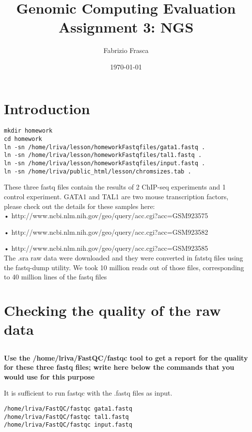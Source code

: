 \documentclass[12pt, a4paper]{article}
\title{\textbf{Genomic Computing Evaluation}\\Assignment 3: NGS}
\author{Fabrizio Frasca}
\date{\today}
\begin{document}
	
\maketitle
\clearpage

\section*{Introduction}

\begin{verbatim}
mkdir homework
cd homework
ln -sn /home/lriva/lesson/homeworkFastqfiles/gata1.fastq .
ln -sn /home/lriva/lesson/homeworkFastqfiles/tal1.fastq .
ln -sn /home/lriva/lesson/homeworkFastqfiles/input.fastq .
ln -sn /home/lriva/public_html/lesson/chromsizes.tab .
\end{verbatim}

These three fastq files contain the results of 2 ChIP-seq experiments and 1 control experiment.
GATA1 and TAL1 are two mouse transcription factors, please check out the details for these samples here:\\

• http://www.ncbi.nlm.nih.gov/geo/query/acc.cgi?acc=GSM923575

• http://www.ncbi.nlm.nih.gov/geo/query/acc.cgi?acc=GSM923582

• http://www.ncbi.nlm.nih.gov/geo/query/acc.cgi?acc=GSM923585\\


The .sra raw data were downloaded and they were converted in fatstq files using the fastq-dump utility. We took 10 million reads out of those files, corresponding to 40 million lines of the fastq files

\section{Checking the quality of the raw data}

\subsection{}

\textbf{Use the /home/lriva/FastQC/fastqc tool to get a report for the quality for these three fastq files; write here below the commands that you would use for this purpose}

It is sufficient to run fastqc with the .fastq files as input.

\begin{verbatim}
/home/lriva/FastQC/fastqc gata1.fastq
/home/lriva/FastQC/fastqc tal1.fastq
/home/lriva/FastQC/fastqc input.fastq
\end{verbatim}
\end{document}
